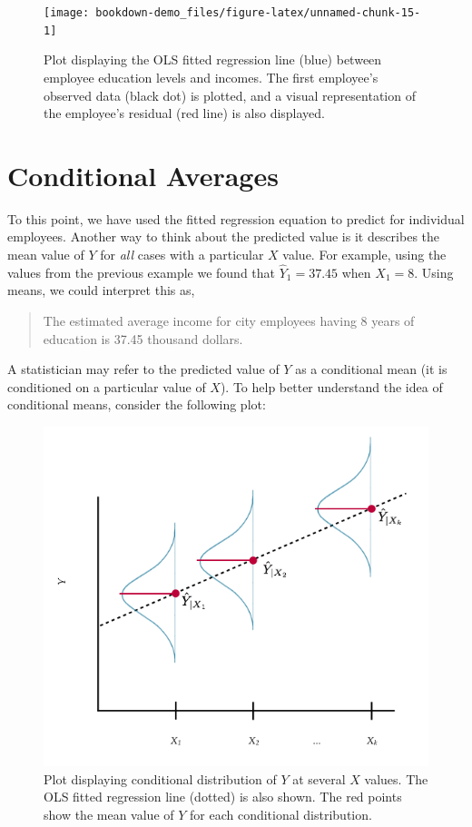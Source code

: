 \documentclass[]{book}
\theoremstyle{definition}
\theoremstyle{definition}
\theoremstyle{definition}
\theoremstyle{remark}
\begin{document}
\begin{figure}
\texttt{[image: bookdown-demo\_files/figure-latex/unnamed-chunk-15-1]} \caption{Plot displaying the OLS fitted regression line (blue) between employee education levels and incomes. The first employee's observed data (black dot) is plotted, and a visual representation of the employee's residual (red line) is also displayed.}\label{fig:unnamed-chunk-15}
\end{figure}

\hypertarget{conditional-averages}{%
\section{Conditional Averages}\label{conditional-averages}}

To this point, we have used the fitted regression equation to predict
for individual employees. Another way to think about the predicted value
is it describes the mean value of \(Y\) for \emph{all} cases with a
particular \(X\) value. For example, using the values from the previous
example we found that \(\hat{Y}_{1} = 37.45\) when \(X_{1}=8\). Using
means, we could interpret this as,

\begin{quote}
The estimated average income for city employees having 8 years of
education is 37.45 thousand dollars.
\end{quote}

A statistician may refer to the predicted value of \(Y\) as a
conditional mean (it is conditioned on a particular value of \(X\)). To
help better understand the idea of conditional means, consider the
following plot:

\begin{figure}
\includegraphics[width=0.5\linewidth]{images/conditional-means} \caption{Plot displaying conditional distribution of $Y$ at several $X$ values. The OLS fitted regression line (dotted) is also shown. The red points show the mean value of $Y$ for each conditional distribution.}\label{fig:unnamed-chunk-16}
\end{figure}
\end{document}
